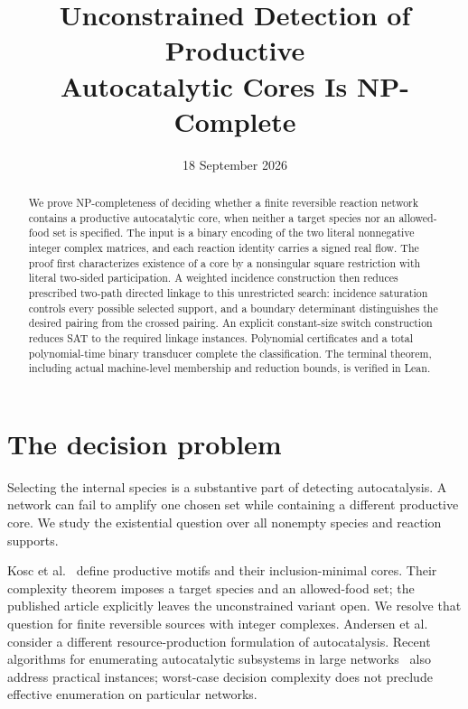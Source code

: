 \documentclass[11pt,a4paper]{article}
\title{Unconstrained Detection of Productive\\Autocatalytic Cores Is NP-Complete}
\author{}
\date{18 September 2026}
\begin{document}
\maketitle
\begin{abstract}
We prove NP-completeness of deciding whether a finite reversible reaction
network contains a productive autocatalytic core, when neither a target
species nor an allowed-food set is specified. The input is a binary encoding
of the two literal nonnegative integer complex matrices, and each reaction
identity carries a signed real flow. The proof first characterizes existence
of a core by a nonsingular square restriction with literal two-sided
participation. A weighted incidence construction then reduces prescribed
two-path directed linkage to this unrestricted search: incidence saturation
controls every possible selected support, and a boundary determinant
distinguishes the desired pairing from the crossed pairing. An explicit
constant-size switch construction reduces SAT to the required linkage
instances. Polynomial certificates and a total polynomial-time binary
transducer complete the classification. The terminal theorem, including
actual machine-level membership and reduction bounds, is verified in Lean.
\end{abstract}

\section{The decision problem}
Selecting the internal species is a substantive part of detecting
autocatalysis. A network can fail to amplify one chosen set while containing
a different productive core. We study the existential question over all
nonempty species and reaction supports.

Kosc et al.~\cite{kosc} define productive motifs and their inclusion-minimal
cores. Their complexity theorem imposes a target species and an allowed-food
set; the published article explicitly leaves the unconstrained variant
open. We resolve that question for finite reversible sources with integer
complexes. Andersen et al.~\cite{andersen} consider a different
resource-production formulation of autocatalysis. Recent algorithms for
enumerating autocatalytic subsystems in large networks~\cite{enumeration}
also address practical instances; worst-case decision complexity does not
preclude effective enumeration on particular networks.
\end{document}
